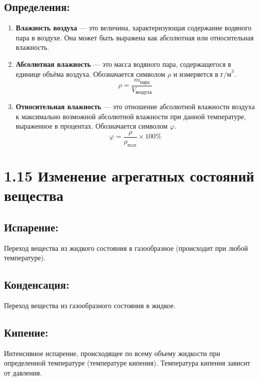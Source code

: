\documentclass[a4paper,12pt]{article}
\begin{document}
\subsection*{Определения:}
\vspace{-3pt}
\begin{enumerate}
    \item \textbf{Влажность воздуха} --- это величина, характеризующая содержание водяного пара в воздухе. Она может быть выражена как абсолютная или относительная влажность.
    \item \textbf{Абсолютная влажность} --- это масса водяного пара, содержащегося в единице объёма воздуха. Обозначается символом $\rho$ и измеряется в $\text{г/м}^3$.
        $$ \rho = \frac{m_{\text{пара}}}{V_{\text{воздуха}}} $$
    \item \textbf{Относительная влажность} — это отношение абсолютной влажности воздуха к максимально возможной абсолютной влажности при данной температуре, выраженное в процентах. Обозначается символом $\varphi$.
        $$ \varphi = \frac{\rho}{\rho_{\text{max}}} \times 100\% $$
\end{enumerate}


\section*{1.15 Изменение агрегатных состояний вещества}

\vspace{-9pt}
\subsection*{Испарение:}
\vspace{-3pt}
Переход вещества из жидкого состояния в газообразное (происходит при любой температуре).

\vspace{-9pt}
\subsection*{Конденсация:}
\vspace{-3pt}
Переход вещества из газообразного состояния в жидкое.

\vspace{-9pt}
\subsection*{Кипение:}
\vspace{-3pt}
Интенсивное испарение, происходящее по всему объему жидкости при определенной температуре (температуре кипения). Температура кипения зависит от давления.
\end{document}
